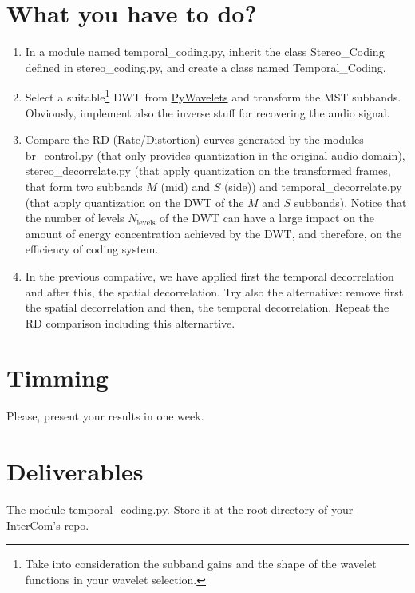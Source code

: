 \section{What you have to do?}

\begin{enumerate}
\item In a module named temporal\_coding.py, inherit the class
  Stereo\_Coding defined in stereo\_coding.py, and create
  a class named Temporal\_Coding.
\item Select a suitable\footnote{Take into consideration the subband
    gains and the shape of the wavelet functions in your wavelet
    selection.} DWT
    from \href{https://pywavelets.readthedocs.io/en/latest/}{PyWavelets}
    and transform the MST subbands. Obviously, implement also the
    inverse stuff for recovering the audio signal.
\item Compare the RD (Rate/Distortion) curves generated by the modules
  br\_control.py (that only provides quantization in the original
  audio domain), stereo\_decorrelate.py (that apply quantization on
  the transformed frames, that form two subbands $M$ (mid) and $S$
  (side)) and temporal\_decorrelate.py (that apply quantization on the
  DWT of the $M$ and $S$ subbands). Notice that the number of levels
  $N_{\text{levels}}$ of the DWT can have a large impact on the amount
  of energy concentration achieved by the DWT, and therefore, on the
  efficiency of coding system.
\item In the previous compative, we have applied first the temporal
  decorrelation and after this, the spatial decorrelation. Try also
  the alternative: remove first the spatial decorrelation and then,
  the temporal decorrelation. Repeat the RD comparison including this
  alternartive.
\end{enumerate}

\section{Timming}

Please, present your results in one week.

\section{Deliverables}

The module temporal\_coding.py. Store it at the
\href{https://github.com/Tecnologias-multimedia/intercom}{root
  directory} of your InterCom's repo.

